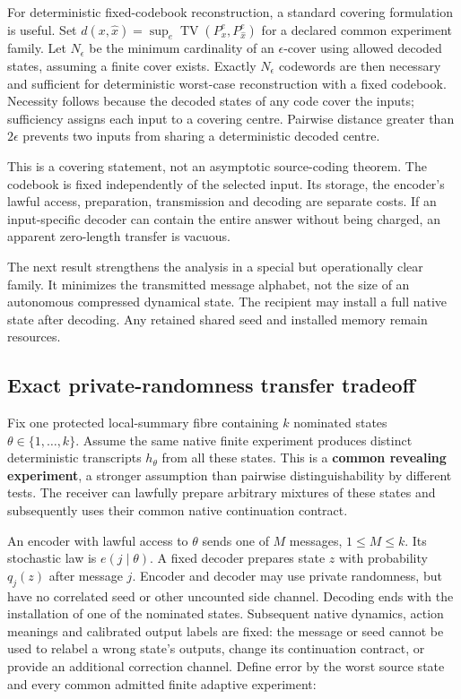 \documentclass[
  11pt,
  a4paper,
]{article}
\begin{document}
For deterministic fixed-codebook reconstruction, a standard covering
formulation is useful. Set
\(d(x,\widehat x)=\sup_e\operatorname{TV}(P_x^e,P_{\widehat x}^e)\) for
a declared common experiment family. Let \(N_\epsilon\) be the minimum
cardinality of an \(\epsilon\)-cover using allowed decoded states,
assuming a finite cover exists. Exactly \(N_\epsilon\) codewords are
then necessary and sufficient for deterministic worst-case
reconstruction with a fixed codebook. Necessity follows because the
decoded states of any code cover the inputs; sufficiency assigns each
input to a covering centre. Pairwise distance greater than \(2\epsilon\)
prevents two inputs from sharing a deterministic decoded centre.

This is a covering statement, not an asymptotic source-coding theorem.
The codebook is fixed independently of the selected input. Its storage,
the encoder's lawful access, preparation, transmission and decoding are
separate costs. If an input-specific decoder can contain the entire
answer without being charged, an apparent zero-length transfer is
vacuous.

The next result strengthens the analysis in a special but operationally
clear family. It minimizes the transmitted message alphabet, not the
size of an autonomous compressed dynamical state. The recipient may
install a full native state after decoding. Any retained shared seed and
installed memory remain resources.

\subsection{Exact private-randomness transfer
tradeoff}\label{exact-private-randomness-transfer-tradeoff}

Fix one protected local-summary fibre containing \(k\) nominated states
\(\theta\in\{1,\ldots,k\}\). Assume the same native finite experiment
produces distinct deterministic transcripts \(h_\theta\) from all these
states. This is a \textbf{common revealing experiment}, a stronger
assumption than pairwise distinguishability by different tests. The
receiver can lawfully prepare arbitrary mixtures of these states and
subsequently uses their common native continuation contract.

An encoder with lawful access to \(\theta\) sends one of \(M\) messages,
\(1\le M\le k\). Its stochastic law is \(e(j\mid\theta)\). A fixed
decoder prepares state \(z\) with probability \(q_j(z)\) after message
\(j\). Encoder and decoder may use private randomness, but have no
correlated seed or other uncounted side channel. Decoding ends with the
installation of one of the nominated states. Subsequent native dynamics,
action meanings and calibrated output labels are fixed: the message or
seed cannot be used to relabel a wrong state's outputs, change its
continuation contract, or provide an additional correction channel.
Define error by the worst source state and every common admitted finite
adaptive experiment:
\end{document}
